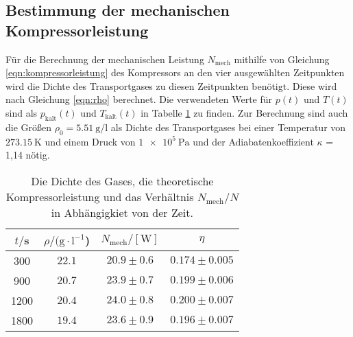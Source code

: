 \subsection{Bestimmung der mechanischen Kompressorleistung}
Für die Berechnung der mechanischen Leistung $N_\text{mech}$ mithilfe von Gleichung
\eqref{eqn:kompressorleistung} des Kompressors an den vier ausgewählten Zeitpunkten
wird die Dichte des Transportgases zu diesen Zeitpunkten benötigt.
Diese wird nach Gleichung \eqref{eqn:rho} berechnet. Die verwendeten Werte für $p(t)$
und $T(t)$ sind als $p_\text{kalt}(t)$ und $T_\text{kalt}(t)$ in Tabelle \ref{tab:datalast} zu finden.
Zur Berechnung sind auch die Größen $\rho_0 = \SI{5.51}{\gram\per\litre}$ als Dichte
des Transportgases bei einer Temperatur von $\SI{273.15}{\kelvin}$ und einem Druck von
$\SI{1e5}{\pascal}$ und der Adiabatenkoeffizient $\kappa$ = 1,14 nötig.

\begin{table}
	\centering
	\caption{Die Dichte des Gases, die theoretische Kompressorleistung und das Verhältnis $N_\text{mech}/N$ in Abhängigkiet von der Zeit.}
  \label{tab:datalast}
	\begin{tabular}{cccc}
		\toprule
		$t/$s & $\rho/(\text{g} \cdot \text{l}^{-1}$) & $N_\text{mech} / [\mathrm{W}]$ & $\eta$\\
		\midrule
		300 & $22.1$ & $20.9 \pm 0.6$ & $0.174 \pm 0.005$ \\
		900 & $20.7$ & $23.9 \pm 0.7$ & $0.199 \pm 0.006$\\
	  1200 & $20.4$ & $24.0 \pm 0.8$ & $0.200 \pm 0.007$\\
		1800 & $19.4$ & $23.6 \pm 0.9$ & $0.196 \pm 0.007$\\
		\bottomrule
	\end{tabular}
\end{table}
